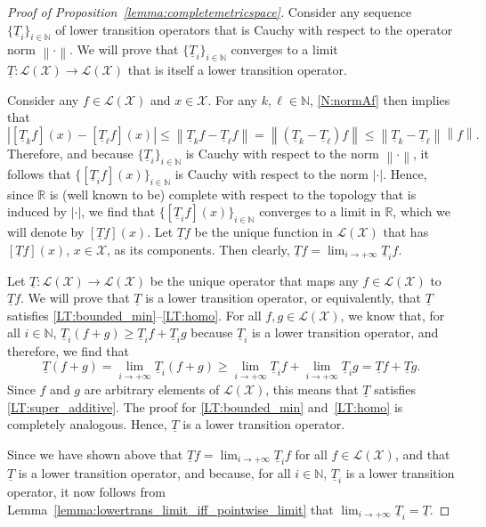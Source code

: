 \documentclass[10pt,a4paper]{paper}
\theoremstyle{definition}
\newcommand{\nats}{\mathbb{N}}
\newcommand{\reals}{\mathbb{R}}
\newcommand{\realspos}{\reals_{>0}}
\newcommand{\states}{\mathcal{X}}
\newcommand{\lt}{\underline{T}}
\newcommand{\gambles}{\mathcal{L}}
\newcommand{\gamblesX}{\gambles(\states)}
\newcommand{\norm}[1]{\left\lVert #1 \right\rVert}
\newcommand{\abs}[1]{\left\vert #1 \right\vert}
\begin{document}
\begin{proof}[Proof of Proposition~\ref{lemma:completemetricspace}]
Consider any sequence $\{\lt_i\}_{i\in\nats}$ of lower transition operators that is Cauchy with respect to the operator norm $\norm{\cdot}$. We will prove that $\{\lt_i\}_{i\in\nats}$ converges to a limit $\lt\colon\gamblesX\to\gamblesX$ that is itself a lower transition operator.

Consider any $f\in\gamblesX$ and $x\in\states$. For any $k,\ell\in\nats$, \eqref{N:normAf} then implies that
\begin{equation*}
\abs{[\lt_k f](x)-[\lt_\ell f](x)}
\leq\norm{\lt_k f-\lt_\ell f}
=\norm{(\lt_k-\lt_\ell)f}
\leq\norm{\lt_k-\lt_\ell}\norm{f}.
\end{equation*}
Therefore, and because $\{\lt_i\}_{i\in\nats}$ is Cauchy with respect to the norm $\norm{\cdot}$, it follows that $\{[\lt_i f](x)\}_{i\in\nats}$ is Cauchy with respect to the norm $\abs{\cdot}$. Hence, since $\reals$ is (well known to be) complete with respect to the topology that is induced by $\abs{\cdot}$, we find that $\{[\lt_i f](x)\}_{i\in\nats}$ converges to a limit in $\reals$, which we will denote by $[\lt f](x)$. Let $\lt f$ be the unique function in $\gamblesX$ that has $[\lt f](x)$, $x\in\states$, as its components. Then clearly, $\lt f=\lim_{i\to+\infty}\lt_if$. 

Let $\lt\colon\gamblesX\to\gamblesX$ be the unique operator that maps any $f\in\gamblesX$ to $\lt f$. We will prove that $\lt$ is a lower transition operator, or equivalently, that $\lt$ satisfies \ref{LT:bounded_min}--\ref{LT:homo}. For all $f,g\in\gamblesX$, we know that, for all $i\in\nats$, $\lt_i(f+g)\geq\lt_if+\lt_ig$ because $\lt_i$ is a lower transition operator, and therefore, we find that
\begin{equation*}
\lt(f+g)
=\lim_{i\to+\infty}\lt_i(f+g)
\geq\lim_{i\to+\infty}\lt_if
+
\lim_{i\to+\infty}\lt_ig=\lt f+\lt g.
\end{equation*}
Since $f$ and $g$ are arbitrary elements of $\gamblesX$, this means that $\lt$ satisfies \ref{LT:super_additive}. The proof for \ref{LT:bounded_min} and~\ref{LT:homo} is completely analogous. Hence, $\lt$ is a lower transition operator. 

Since we have shown above that $\lt f=\lim_{i\to+\infty}\lt_i f$ for all $f\in\gamblesX$, and that $\lt$ is a lower transition operator, and because, for all $i\in\nats$, $\lt_i$ is a lower transition operator, it now follows from Lemma~\ref{lemma:lowertrans_limit_iff_pointwise_limit} that $\lim_{i\to+\infty}\lt_i=\lt$.
\end{proof}
\end{document}
